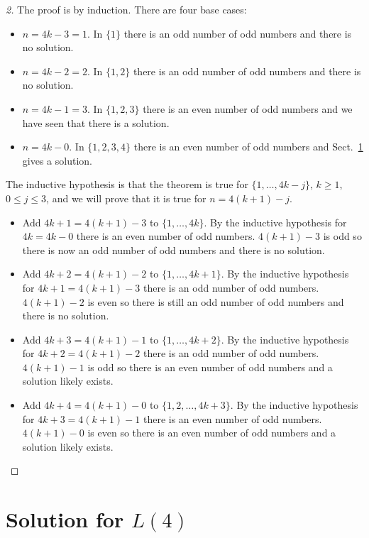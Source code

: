 \begin{proof}[2] 
The proof is by induction.
There are four base cases:
\begin{itemize}
\item $n=4k-3=1$. In $\{1\}$ there is an odd number of odd numbers and there is no solution.
\item $n=4k-2=2$. In $\{1,2\}$ there is an odd number of odd numbers and there is no solution.
\item $n=4k-1=3$. In $\{1,2,3\}$ there is an even number of odd numbers and we have seen that there is a solution.
\item $n=4k-0$. In $\{1,2,3,4\}$ there is an even number of odd numbers and Sect.~\ref{s.langford-four} gives a solution.
\end{itemize}

The inductive hypothesis is that the theorem is true for $\{1,\ldots,4k-j\}$, $k\ge 1$, $0\leq j\leq 3$, and we will prove that it is true for $n=4(k+1)-j$.

\begin{itemize}
\item Add $4k+1=4(k+1)-3$ to $\{1,\ldots,4k\}$. By the inductive hypothesis for $4k=4k-0$ there is an even number of odd numbers. $4(k+1)-3$ is odd so there is now an odd number of odd numbers and there is no solution.
\item Add $4k+2=4(k+1)-2$ to $\{1,\ldots,4k+1\}$. By the inductive hypothesis for $4k+1=4(k+1)-3$ there is an odd number of odd numbers. $4(k+1)-2$ is even so there is still an odd number of odd numbers and there is no solution.
\item Add $4k+3=4(k+1)-1$ to $\{1,\ldots,4k+2\}$. By the inductive hypothesis for $4k+2=4(k+1)-2$ there is an odd number of odd numbers. $4(k+1)-1$ is odd so there is an even number of odd numbers and a solution likely exists.
\item Add $4k+4=4(k+1)-0$ to $\{1,2,\ldots,4k+3\}$. By the inductive hypothesis for $4k+3=4(k+1)-1$ there is an even number of odd numbers. $4(k+1)-0$ is even so there is an even number of odd numbers and a solution likely exists.
\end{itemize}
\end{proof}


\newpage

\section{Solution for $L(4)$}\label{s.langford-four}

